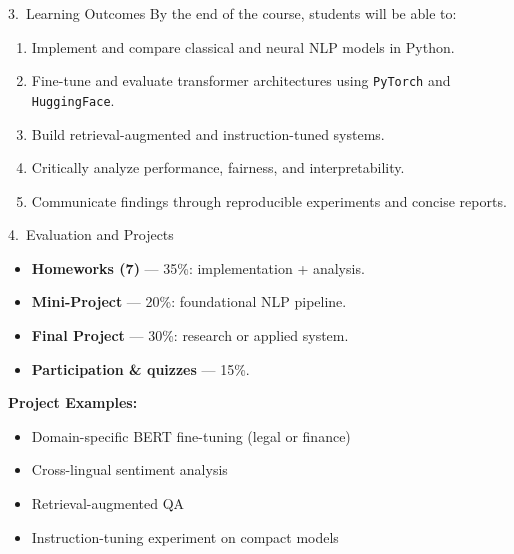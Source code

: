 \documentclass[aspectratio=169]{beamer}
\begin{document}
\begin{frame}{3.~Learning Outcomes}
By the end of the course, students will be able to:
\begin{enumerate}[leftmargin=*]
  \item Implement and compare classical and neural NLP models in Python.
  \item Fine-tune and evaluate transformer architectures using \texttt{PyTorch} and \texttt{HuggingFace}.
  \item Build retrieval-augmented and instruction-tuned systems.
  \item Critically analyze performance, fairness, and interpretability.
  \item Communicate findings through reproducible experiments and concise reports.
\end{enumerate}
\end{frame}

\begin{frame}{4.~Evaluation and Projects}
\begin{itemize}
  \item \textbf{Homeworks (7)} --- 35\%: implementation + analysis.
  \item \textbf{Mini-Project} --- 20\%: foundational NLP pipeline.
  \item \textbf{Final Project} --- 30\%: research or applied system.
  \item \textbf{Participation \& quizzes} --- 15\%.
\end{itemize}

\medskip
\textbf{Project Examples:}
\begin{itemize}
  \item Domain-specific BERT fine-tuning (legal or finance)
  \item Cross-lingual sentiment analysis
  \item Retrieval-augmented QA
  \item Instruction-tuning experiment on compact models
\end{itemize}
\end{frame}
\end{document}
